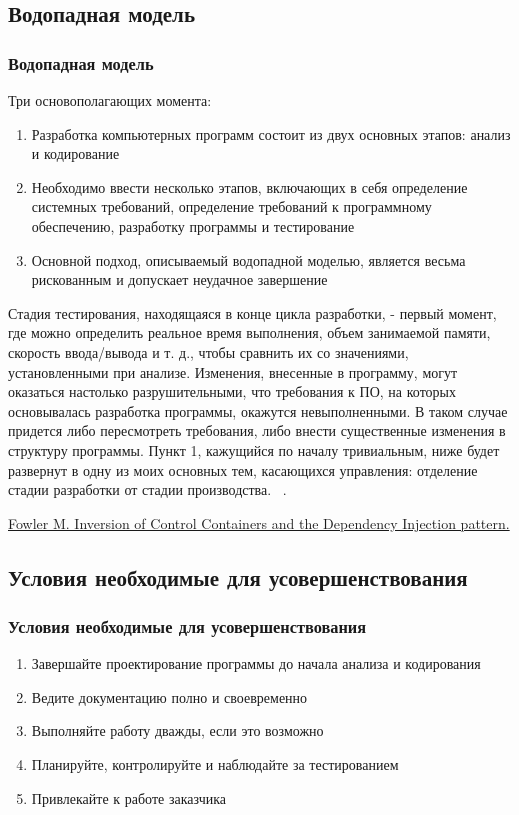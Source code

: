 \documentclass{../industrial-development}
\begin{document}
\subsection{Водопадная модель}
\begin{frame} \frametitle{Водопадная модель}
Три основополагающих момента: 
	\begin{enumerate}
	\item Разработка компьютерных программ состоит из двух основных этапов: анализ и кодирование
	\item Необходимо ввести несколько этапов, включающих в себя определение системных требований, определение требований к программному обеспечению, разработку программы и тестирование
	\item Основной подход, описываемый водопадной моделью, является весьма рискованным и допускает неудачное завершение
	\end{enumerate}
\end{frame}

\lecturenotes
Стадия тестирования, находящаяся в конце цикла разработки, - первый момент, где можно определить реальное время выполнения, объем занимаемой памяти, скорость ввода/вывода и т. д., чтобы сравнить их со значениями, установленными при анализе. Изменения, внесенные в программу, могут оказаться настолько разрушительными, что требования к ПО, на которых основывалась разработка программы, окажутся невыполненными. В таком случае придется либо пересмотреть требования, либо внести существенные изменения в структуру программы. Пункт 1, кажущийся по началу тривиальным, ниже будет развернут в одну из моих основных тем, касающихся управления: отделение стадии разработки от стадии производства. 
~\cite{Fowler}.
\begin{thebibliography}{99}
 \href{https://project.dovidnyk.info/index.php/programnye-proekty/upravlenieproektamiposozdaniyuprogrammnogoobespecheniya/66-tradicionnoe_upravlenie_razrabotkoj_po}{Fowler M. Inversion of Control Containers and the Dependency Injection pattern.}
\end{thebibliography}


\subsection{Условия необходимые для усовершенствования}
\begin{frame} \frametitle{Условия необходимые для усовершенствования}
	\begin{enumerate}
	 \item Завершайте проектирование программы до начала анализа и кодирования 
	 \item Ведите документацию полно и своевременно 
	 \item Выполняйте работу дважды, если это возможно 
	 \item Планируйте, контролируйте и наблюдайте за тестированием 
	 \item Привлекайте к работе заказчика 
	\end{enumerate}
\end{frame}
\end{document}
